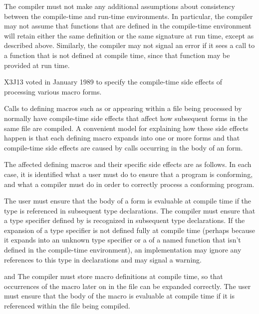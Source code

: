 \begin{newer}
The compiler must not make any additional assumptions about
consistency between the compile-time and run-time environments.  In 
particular, the compiler may not assume that functions that are defined
	in the compile-time environment will retain either the
	same definition or the same signature at run time, except
as described above.
Similarly,
the compiler may not signal an error if it sees a call to a
	function that is not defined at compile time, since that function
	may be provided at run time.

X3J13 voted in January 1989 
to specify the compile-time side effects of processing various macro forms.

Calls to defining macros such as  or  appearing
    within a file being processed by  normally have
    compile-time side effects that affect how subsequent forms in the
    same file are compiled.  A convenient model for explaining how these
    side effects happen is that each defining macro expands into one or
    more  forms and that compile-time
    side effects are caused by calls occurring in the body of an
     form.

The affected defining macros and their specific side effects are
    as follows.  In each case, it is identified what a user must do to
    ensure that a program is conforming, and what a compiler must do
    in order to correctly process a conforming program.

\begin{flushdesc}
\item[\cdf{deftype}]
The user must ensure that the body of a  form is
    evaluable at compile time if the type is referenced in subsequent type
    declarations.  The compiler must ensure that a type
    specifier defined by 
    is recognized in subsequent type declarations.  If the
    expansion of a type specifier is not defined fully at compile time
    (perhaps because it expands into an unknown type specifier or a
     of a named function that isn't defined in the compile-time
    environment), an implementation may ignore any references to this type
    in declarations and may signal a warning.

\item[\cdf{defmacro} and \cdf{define-modify-macro}]   
The compiler must store macro
    definitions at compile time, so that occurrences of the macro later on
    in the file can be expanded correctly.  The user must ensure that the
    body of the macro is evaluable at compile time if it is referenced
    within the file being compiled.


\end{flushdesc}
\end{newer}
